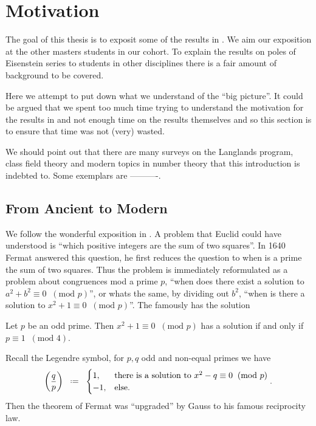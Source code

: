 \section*{Motivation}
The goal of this thesis is to exposit some of the results in \cite{jiangPolesCertainResidual2013}. We aim our exposition at the other masters students in our cohort.
To explain the results on poles of Eisenstein series to students in other disciplines there is a fair amount of background to be covered.

Here we attempt to put down what we understand of the ``big picture''. It could be argued that we spent too much time trying to understand the motivation for the results in \cite{jiangPolesCertainResidual2013} and not enough time on the results themselves and so this section is to ensure that time was not (very) wasted. 

We should point out that there are many surveys on the Langlands program, class field theory and modern topics in number theory that this introduction is indebted to. Some exemplars are ----------.

\subsection{From Ancient to Modern}
We follow the wonderful exposition in \cite{weinsteinReciprocityLawsGalois2015}. A problem that Euclid could have understood is ``which positive integers are the sum of two squares''. In 1640 Fermat answered this question, he first reduces the question to when is a prime the sum of two squares. Thus the problem is immediately reformulated as a problem about congruences mod a prime \(p\), ``when does there exist a solution to \(a^2  +b^2 \equiv 0 \;\;(\text{mod }p) \)'', or whats the same, by dividing out \(b^2\), ``when is there a solution to \(x^2 + 1 \equiv 0 \;\;(\text{mod }p)\)''. The famously has the solution 
\begin{Theorem}
	Let \(p\) be an odd prime. Then \(x^2 + 1 \equiv 0 \;\;(\text{mod }p)\) has a solution if and only if \(p\equiv 1 \;\;(\text{mod }4) \).
\end{Theorem}

Recall the Legendre symbol, for \(p, q\) odd and non-equal primes we have 
\[\left(\frac{q}{p}\right) \defeq \begin{cases}
	1 , & \text{there is a solution to }x^2 - q \equiv 0 \;\;(\text{mod }p)\\
	-1 , & \text{else.}
\end{cases}.\]
Then the theorem of Fermat was ``upgraded'' by Gauss to his famous reciprocity law.

